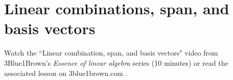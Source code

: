 \section{Linear combinations, span, and basis vectors}

Watch the ``Linear combination, span, and basis vectors" video from
3Blue1Brown's \textit{Essence of linear algebra} series (10 minutes) or read the
associated lesson on 3blue1brown.com
\cite{bib:3b1b_linalg_linear_combinations}.
